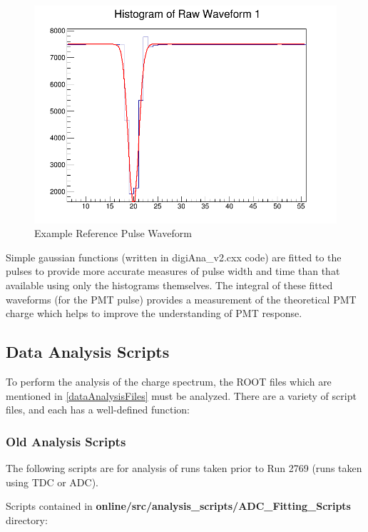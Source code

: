 \documentclass[twoside,letterpaper]{refart}
\begin{document}
\FloatBarrier

\begin{figure}[!htpb] 
	\centering	
	\includegraphics[scale=0.3]{images/refWav.png}
	\caption{Example Reference Pulse Waveform}
	\label{refWav}
\end{figure}

\FloatBarrier

Simple gaussian functions (written in digiAna\_v2.cxx code) are fitted to the pulses to provide more accurate measures of pulse width and time than that available using only the histograms themselves.  The integral of these fitted waveforms (for the PMT pulse) provides a measurement of the theoretical PMT charge which helps to improve the understanding of PMT response.

\subsection{Data Analysis Scripts}

To perform the analysis of the charge spectrum, the ROOT files which are mentioned in \ref{dataAnalysisFiles} must be analyzed.  There are a variety of script files, and each has a well-defined function:

\subsubsection{Old Analysis Scripts}

The following scripts are for analysis of runs taken prior to Run 2769 (runs taken using TDC or ADC).

Scripts contained in \textbf{online/src/analysis\_scripts/ADC\_Fitting\_Scripts} directory:
\end{document}
